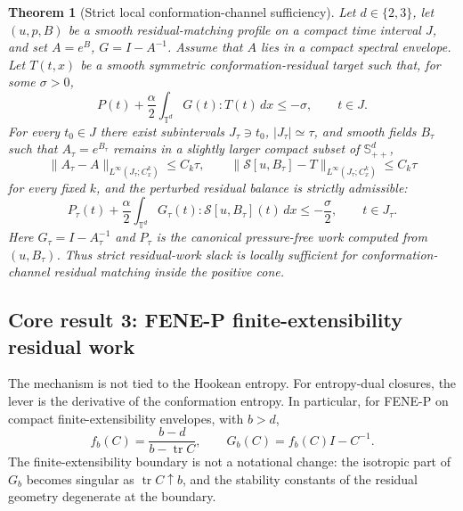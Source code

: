 \documentclass[11pt]{article}
\numberwithin{equation}{section}
\newtheorem{maintheorem}{Theorem}
\begin{document}
\begin{maintheorem}[Strict local conformation-channel sufficiency]
\label{thm:strict-local-sufficiency}
Let \(d\in\{2,3\}\), let \((u,p,B)\) be a smooth residual-matching profile on a
compact time interval \(J\), and set \(A=e^B\), \(G=I-A^{-1}\).  Assume that
\(A\) lies in a compact spectral envelope.  Let \(T(t,x)\) be a smooth symmetric
conformation-residual target such that, for some \(\sigma>0\),
\[
  P(t)+\frac{\alpha}{2}\int_{\mathbb T^d}G(t):T(t)\,dx
  \le -\sigma,
  \qquad t\in J .
\]
For every \(t_0\in J\) there exist subintervals \(J_\tau\ni t_0\),
\(|J_\tau|\simeq \tau\), and smooth fields \(B_\tau\) such that
\(A_\tau=e^{B_\tau}\) remains in a slightly larger compact subset of
\(\mathbb S_{++}^d\),
\[
  \|A_\tau-A\|_{L^\infty(J_\tau;C^k_x)}\le C_k\tau,
  \qquad
  \|\mathcal S[u,B_\tau]-T\|_{L^\infty(J_\tau;C^k_x)}\le C_k\tau
\]
for every fixed \(k\), and the perturbed residual balance is strictly
admissible:
\[
  P_\tau(t)+\frac{\alpha}{2}
  \int_{\mathbb T^d}G_\tau(t):\mathcal S[u,B_\tau](t)\,dx
  \le -\frac{\sigma}{2},
  \qquad t\in J_\tau .
\]
Here \(G_\tau=I-A_\tau^{-1}\) and \(P_\tau\) is the canonical pressure-free work
computed from \((u,B_\tau)\).  Thus strict residual-work slack is locally sufficient for conformation-channel
residual matching inside the positive cone.
\end{maintheorem}

\subsection*{Core result 3: FENE-P finite-extensibility residual work}

The mechanism is not tied to the Hookean entropy.  For entropy-dual closures,
the lever is the derivative of the conformation entropy.  In particular, for
FENE-P on compact finite-extensibility envelopes, with \(b>d\),
\[
  f_b(C)=\frac{b-d}{b-\operatorname{tr}C},\qquad
  G_b(C)=f_b(C)I-C^{-1}.
\]
The finite-extensibility boundary is not a notational change: the isotropic
part of \(G_b\) becomes singular as \(\operatorname{tr}C\uparrow b\), and the
stability constants of the residual geometry degenerate at the boundary.
\end{document}
